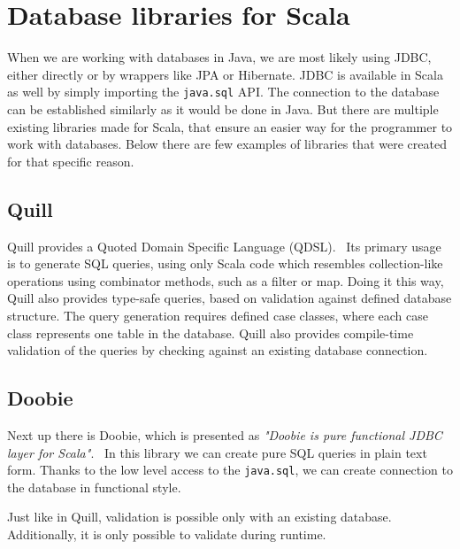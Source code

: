 \section{Database libraries for Scala}
When we are working with databases in Java, we are most likely using JDBC, either directly or by wrappers like JPA or Hibernate. JDBC is available in Scala as well by simply importing the \texttt{java.sql} API. The connection to the database can be established similarly as it would be done in Java. But there are multiple existing libraries made for Scala, that ensure an easier way for the programmer to work with databases. Below there are few examples of libraries that were created for that specific reason.

\subsection{Quill}
Quill provides a Quoted Domain Specific Language (QDSL).~\cite{Quill} Its primary usage is to generate SQL queries, using only Scala code which resembles collection-like operations using combinator methods, such as a filter or map. Doing it this way, Quill also provides type-safe queries, based on validation against defined database structure. The query generation requires defined case classes, where each case class represents one table in the database. Quill also provides compile-time validation of the queries by checking against an existing database connection.

\subsection{Doobie}
Next up there is Doobie, which is presented as \textit{"Doobie is pure functional JDBC layer for Scala"}.~\cite{Doobie} In this library we can create pure SQL queries in plain text form. Thanks to the low level access to the \texttt{java.sql}, we can create connection to the database in functional style. 

Just like in Quill, validation is possible only with an existing database. Additionally, it is only possible to validate during runtime.

